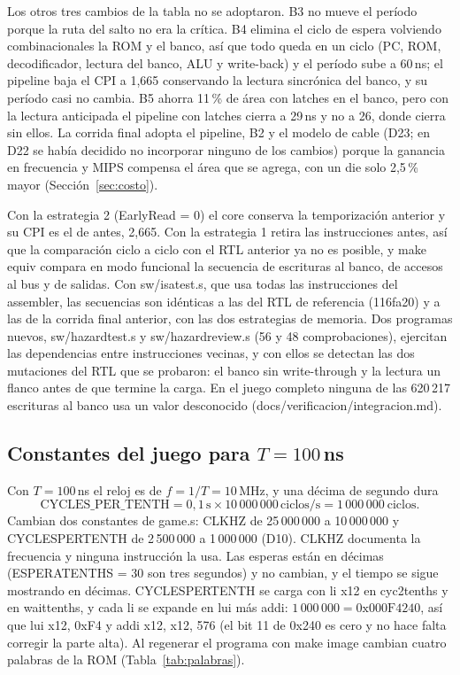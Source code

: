 \documentclass[11pt,a4paper]{article}
\DeclareRobustCommand{\sig}[1]{{\ttfamily\def\_{\textunderscore\allowbreak}#1}}
\begin{document}
Los otros tres cambios de la tabla no se adoptaron. B3 no mueve el período porque la ruta del salto no era la crítica. B4 elimina el ciclo de espera volviendo combinacionales la ROM y el banco, así que todo queda en un ciclo (PC, ROM, decodificador, lectura del banco, ALU y write-back) y el período sube a 60\,ns; el pipeline baja el CPI a 1,665 conservando la lectura sincrónica del banco, y su período casi no cambia. B5 ahorra 11\,\% de área con latches en el banco, pero con la lectura anticipada el pipeline con latches cierra a 29\,ns y no a 26, donde cierra sin ellos. La corrida final adopta el pipeline, B2 y el modelo de cable (D23; en D22 se había decidido no incorporar ninguno de los cambios) porque la ganancia en frecuencia y MIPS compensa el área que se agrega, con un die solo 2,5\,\% mayor (Sección~\ref{sec:costo}).

Con la estrategia 2 (\sig{EarlyRead = 0}) el core conserva la temporización anterior y su CPI es el de antes, 2,665. Con la estrategia 1 retira las instrucciones antes, así que la comparación ciclo a ciclo con el RTL anterior ya no es posible, y \sig{make equiv} compara en modo funcional la secuencia de escrituras al banco, de accesos al bus y de salidas. Con \sig{sw/isa\_test.s}, que usa todas las instrucciones del assembler, las secuencias son idénticas a las del RTL de referencia (\sig{116fa20}) y a las de la corrida final anterior, con las dos estrategias de memoria. Dos programas nuevos, \sig{sw/hazard\_test.s} y \sig{sw/hazard\_review.s} (56 y 48 comprobaciones), ejercitan las dependencias entre instrucciones vecinas, y con ellos se detectan las dos mutaciones del RTL que se probaron: el banco sin write-through y la lectura un flanco antes de que termine la carga. En el juego completo ninguna de las 620\,217 escrituras al banco usa un valor desconocido (\sig{docs/verificacion/integracion.md}).

\subsection{\texorpdfstring{Constantes del juego para $T = 100$\,ns}{Constantes del juego para T = 100 ns}}
\label{sec:constantes}

Con $T = 100$\,ns el reloj es de $f = 1/T = 10$\,MHz, y una décima de segundo dura
\[
\text{CYCLES\_PER\_TENTH} = 0{,}1\,\text{s} \times 10\,000\,000\,\text{ciclos/s} = 1\,000\,000\ \text{ciclos}.
\]
Cambian dos constantes de \sig{game.s}: \sig{CLK\_HZ} de 25\,000\,000 a 10\,000\,000 y \sig{CYCLES\_PER\_TENTH} de 2\,500\,000 a 1\,000\,000 (D10). \sig{CLK\_HZ} documenta la frecuencia y ninguna instrucción la usa. Las esperas están en décimas (\sig{ESPERA\_TENTHS = 30} son tres segundos) y no cambian, y el tiempo se sigue mostrando en décimas. \sig{CYCLES\_PER\_TENTH} se carga con \sig{li x12} en \sig{cyc2tenths} y en \sig{wait\_tenths}, y cada \sig{li} se expande en \sig{lui} más \sig{addi}: $1\,000\,000 = \text{0x000F4240}$, así que \sig{lui x12, 0xF4} y \sig{addi x12, x12, 576} (el bit 11 de \sig{0x240} es cero y no hace falta corregir la parte alta). Al regenerar el programa con \sig{make image} cambian cuatro palabras de la ROM (Tabla~\ref{tab:palabras}).
\end{document}
